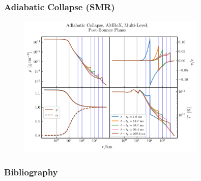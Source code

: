 \documentclass{beamer}
\begin{document}
\begin{frame}
\frametitle{Adiabatic Collapse (SMR)}

  \begin{figure}[htb!]
    \centering
    \includegraphics[width=0.8\textwidth]{fig.PostBounce.png}
  \end{figure}

\end{frame}

\begin{frame}
\frametitle{Bibliography}

  \Fontvi
  

\end{frame}
\end{document}
